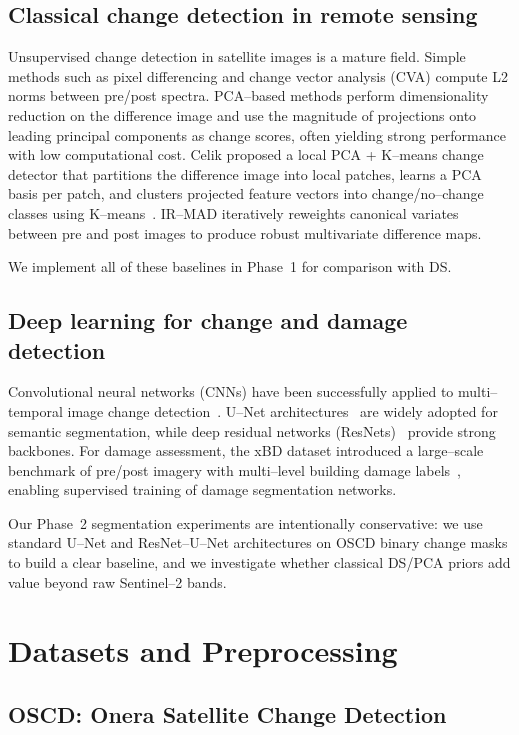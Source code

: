 \documentclass[twoside,11pt]{article}
\begin{document}
\subsection{Classical change detection in remote sensing}

Unsupervised change detection in satellite images is a mature field. Simple
methods such as pixel differencing and change vector analysis (CVA) compute
L2 norms between pre/post spectra. PCA--based methods perform dimensionality
reduction on the difference image and use the magnitude of projections onto
leading principal components as change scores, often yielding strong
performance with low computational cost. Celik proposed a local PCA + K--means
change detector that partitions the difference image into local
patches, learns a PCA basis per patch, and clusters projected feature vectors
into change/no--change classes using K--means~\cite{Celik2009}. IR--MAD
iteratively reweights canonical variates between pre and post images to
produce robust multivariate difference maps.

We implement all of these baselines in Phase~1 for comparison with DS.

\subsection{Deep learning for change and damage detection}

Convolutional neural networks (CNNs) have been successfully applied to
multi--temporal image change detection~\cite{Daudt2018}. U--Net
architectures~\cite{Ronneberger2015} are widely adopted for semantic
segmentation, while deep residual networks (ResNets)~\cite{He2016ResNet}
provide strong backbones. For damage assessment, the xBD dataset introduced a
large--scale benchmark of pre/post imagery with multi--level building damage
labels~\cite{Gupta2019xBD}, enabling supervised training of damage
segmentation networks.

Our Phase~2 segmentation experiments are intentionally conservative: we use
standard U--Net and ResNet--U--Net architectures on OSCD binary change masks
to build a clear baseline, and we investigate whether classical DS/PCA priors
add value beyond raw Sentinel--2 bands.

\section{Datasets and Preprocessing}

\subsection{OSCD: Onera Satellite Change Detection}
\end{document}

